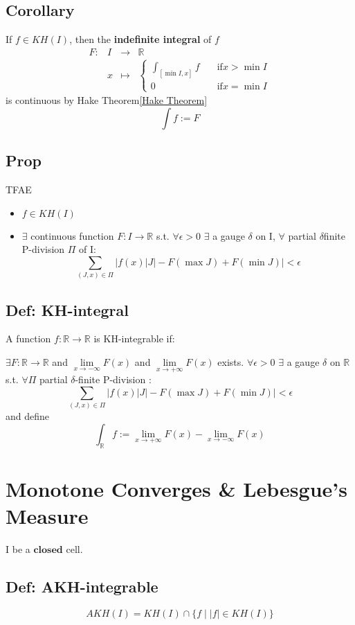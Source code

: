 \documentclass{book}
\newcommand{\abs}[1]{\left\lvert #1 \right\rvert}
\begin{document}
\section{Corollary}
If $f\in KH(I)$, then the \textbf{indefinite integral} of $f$
$$\begin{aligned}
    F:&I&\rightarrow&\mathbb R\\
    &x&\mapsto&\begin{cases}
        \int_{[\min I,x]}f\quad&\text{if}x>\min I\\
        0&\text{if}x=\min I
    \end{cases}
\end{aligned}$$
is continuous by Hake Theorem\ref{Hake Theorem}$$\int f:=F$$
\section{Prop}
TFAE\begin{itemize}
    \item $f\in KH(I)$
    \item $\exists$ continuous function $F:I\rightarrow\mathbb R$ s.t. $\forall \epsilon>0$ $\exists$ a gauge $\delta$ on I, $\forall$ partial $\delta$finite P-division $\Pi$ of I:
    $$\sum\limits_{(J,x)\in \Pi}\abs{f(x)\abs J-F(\max J)+F(\min J)}<\epsilon$$
\end{itemize}
\section{Def: KH-integral}
A function $f:\mathbb R\rightarrow\mathbb R$ is KH-integrable if:

$\exists F:\mathbb R\rightarrow\mathbb R$ and $\lim\limits_{x\rightarrow-\infty}F(x)$ and $\lim\limits_{x\rightarrow+\infty}F(x)$ exists. $\forall \epsilon>0$ $\exists$ a gauge $\delta$ on $\mathbb R$ s.t. $\forall \Pi$ partial $\delta$-finite P-division :
$$\sum\limits_{(J,x)\in \Pi}\abs{f(x)\abs J-F(\max J)+F(\min J)}<\epsilon$$
and define
$$\int_{\mathbb R}f:=\lim\limits_{x\rightarrow+\infty}F(x)-\lim\limits_{x\rightarrow-\infty}F(x)$$
\chapter{Monotone Converges \& Lebesgue's Measure}
I be a $\textbf{closed}$ cell.
\section{Def: AKH-integrable}
$$AKH(I)=KH(I)\cap\{f\mid\abs f\in KH(I)\}$$
\end{document}
